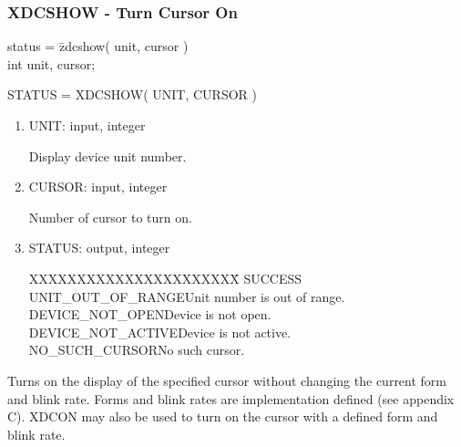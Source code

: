 \subsubsection{XDCSHOW - Turn Cursor On}
\begin{tabbing}
status = \=zdcshow( unit, cursor )\\
\>int  unit, cursor;\\
\end{tabbing}
STATUS = XDCSHOW( UNIT, CURSOR )
\begin{enumerate}
\item UNIT:  input, integer

Display device unit number.
\item CURSOR:  input, integer

Number of cursor to turn on.
\item STATUS:  output, integer
\begin{tabbing}
XXXXXXXXXXXXXXXXXXXXXX\=\kill
SUCCESS\\
UNIT\_OUT\_OF\_RANGE\>Unit number is out of range.\\
DEVICE\_NOT\_OPEN\>Device is not open.\\
DEVICE\_NOT\_ACTIVE\>Device is not active.\\
NO\_SUCH\_CURSOR\>No such cursor.\\
\end{tabbing}
\end{enumerate}
Turns on the display of the specified cursor without changing the
current form and blink rate.  Forms and blink rates are implementation
defined (see appendix C).  XDCON may also be used to turn on the
cursor with a defined form and blink rate.
\newpage

